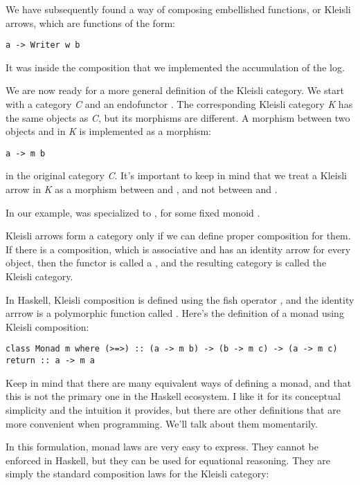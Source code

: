 We have subsequently found a way of composing embellished functions, or
Kleisli arrows, which are functions of the form:

\begin{verbatim}
a -> Writer w b
\end{verbatim}

It was inside the composition that we implemented the accumulation of
the log.

We are now ready for a more general definition of the Kleisli category.
We start with a category \emph{C} and an endofunctor . The
corresponding Kleisli category \emph{K} has the same objects as
\emph{C}, but its morphisms are different. A morphism between two
objects  and  in \emph{K} is implemented as a
morphism:

\begin{verbatim}
a -> m b
\end{verbatim}

in the original category \emph{C}. It's important to keep in mind that
we treat a Kleisli arrow in \emph{K} as a morphism between 
and , and not between  and .

In our example,  was specialized to , for
some fixed monoid .

Kleisli arrows form a category only if we can define proper composition
for them. If there is a composition, which is associative and has an
identity arrow for every object, then the functor  is called a
, and the resulting category is called the Kleisli category.

In Haskell, Kleisli composition is defined using the fish operator
\code{>=>}, and the identity arrrow is a
polymorphic function called . Here's the definition of a
monad using Kleisli composition:

\begin{verbatim}
class Monad m where (>=>) :: (a -> m b) -> (b -> m c) -> (a -> m c) return :: a -> m a
\end{verbatim}

Keep in mind that there are many equivalent ways of defining a monad,
and that this is not the primary one in the Haskell ecosystem. I like it
for its conceptual simplicity and the intuition it provides, but there
are other definitions that are more convenient when programming. We'll
talk about them momentarily.

In this formulation, monad laws are very easy to express. They cannot be
enforced in Haskell, but they can be used for equational reasoning. They
are simply the standard composition laws for the Kleisli category:

